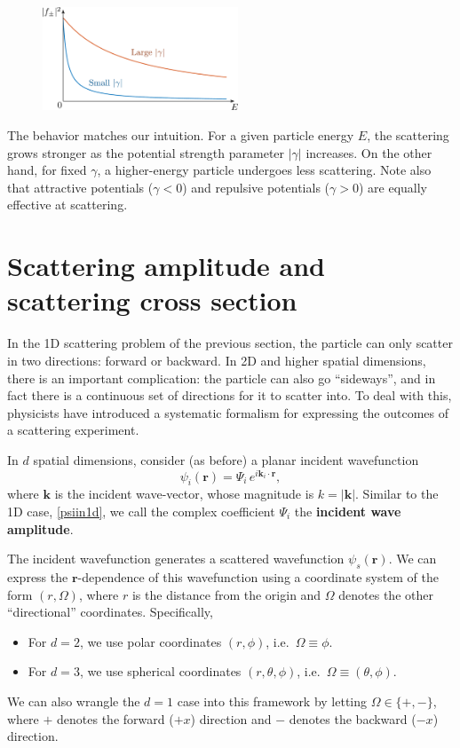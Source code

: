 \documentclass[pra,12pt]{revtex4-2}
\begin{document}
\begin{figure}[h]
  \centering\includegraphics[width=0.52\textwidth]{scattering1df}
\end{figure}

\noindent
The behavior matches our intuition.  For a given particle energy $E$,
the scattering grows stronger as the potential strength parameter
$|\gamma|$ increases.  On the other hand, for fixed $\gamma$, a
higher-energy particle undergoes less scattering.  Note also that
attractive potentials ($\gamma < 0$) and repulsive potentials ($\gamma
> 0$) are equally effective at scattering.

\section{Scattering amplitude and scattering cross section}
\label{sec:scattering_amplitude}

In the 1D scattering problem of the previous section, the particle can
only scatter in two directions: forward or backward.  In 2D and higher
spatial dimensions, there is an important complication: the particle
can also go ``sideways'', and in fact there is a continuous set of
directions for it to scatter into.  To deal with this, physicists have
introduced a systematic formalism for expressing the outcomes of a
scattering experiment.

In $d$ spatial dimensions, consider (as before) a planar incident
wavefunction
\begin{equation}
  \psi_i(\mathbf{r}) = \Psi_i \, e^{i\mathbf{k}_i\cdot\mathbf{r}},
  \label{psiin}
\end{equation}
where $\mathbf{k}$ is the incident wave-vector, whose magnitude is $k
= |\mathbf{k}|$.  Similar to the 1D case, \eqref{psiin1d}, we call the
complex coefficient $\Psi_i$ the \textbf{incident wave amplitude}.

The incident wavefunction generates a scattered wavefunction
$\psi_s(\mathbf{r})$.  We can express the $\mathbf{r}$-dependence of
this wavefunction using a coordinate system of the form $(r,\Omega)$,
where $r$ is the distance from the origin and $\Omega$ denotes the
other ``directional'' coordinates.  Specifically,
\begin{itemize}
\item For $d = 2$, we use polar coordinates $(r,\phi)$, i.e.~$\Omega
  \equiv \phi$.

\item For $d = 3$, we use spherical coordinates $(r, \theta, \phi)$,
  i.e.~$\Omega \equiv (\theta,\phi)$.
\end{itemize}
We can also wrangle the $d = 1$ case into this framework by letting
$\Omega \in \{+, -\}$, where $+$ denotes the forward ($+x$) direction
and $-$ denotes the backward ($-x$) direction.
\end{document}
